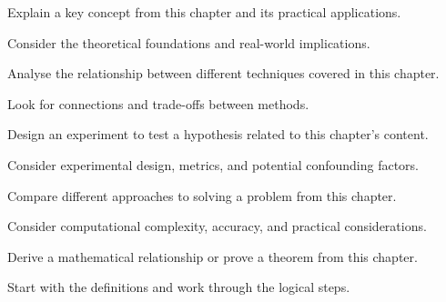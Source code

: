 \begin{exercisebox}[hard]
\begin{problem}
Explain a key concept from this chapter and its practical applications.
\end{problem}
\begin{hintbox}
Consider the theoretical foundations and real-world implications.
\end{hintbox}
\end{exercisebox}

\begin{exercisebox}[hard]
\begin{problem}
Analyse the relationship between different techniques covered in this chapter.
\end{problem}
\begin{hintbox}
Look for connections and trade-offs between methods.
\end{hintbox}
\end{exercisebox}

\begin{exercisebox}[hard]
\begin{problem}
Design an experiment to test a hypothesis related to this chapter's content.
\end{problem}
\begin{hintbox}
Consider experimental design, metrics, and potential confounding factors.
\end{hintbox}
\end{exercisebox}

\begin{exercisebox}[hard]
\begin{problem}
Compare different approaches to solving a problem from this chapter.
\end{problem}
\begin{hintbox}
Consider computational complexity, accuracy, and practical considerations.
\end{hintbox}
\end{exercisebox}

\begin{exercisebox}[hard]
\begin{problem}
Derive a mathematical relationship or prove a theorem from this chapter.
\end{problem}
\begin{hintbox}
Start with the definitions and work through the logical steps.
\end{hintbox}
\end{exercisebox}

